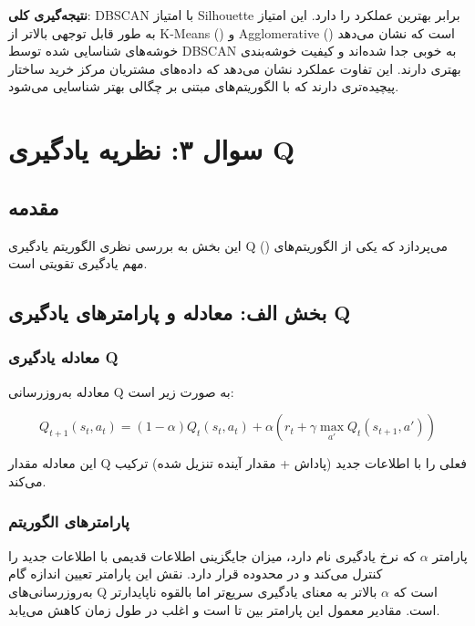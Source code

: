 \documentclass{article}
\begin{document}
\textbf{نتیجه‌گیری کلی}: DBSCAN با امتیاز Silhouette برابر  بهترین عملکرد را دارد. این امتیاز به طور قابل توجهی بالاتر از K-Means () و Agglomerative () است که نشان می‌دهد خوشه‌های شناسایی شده توسط DBSCAN به خوبی جدا شده‌اند و کیفیت خوشه‌بندی بهتری دارند. این تفاوت عملکرد نشان می‌دهد که داده‌های مشتریان مرکز خرید ساختار پیچیده‌تری دارند که با الگوریتم‌های مبتنی بر چگالی بهتر شناسایی می‌شود.

\section{سوال ۳: نظریه یادگیری Q}\label{Section:Q3}

\subsection{مقدمه}

این بخش به بررسی نظری الگوریتم یادگیری Q () می‌پردازد که یکی از الگوریتم‌های مهم یادگیری تقویتی است.

\subsection{بخش الف: معادله و پارامترهای یادگیری Q}

\subsubsection{معادله یادگیری Q}

معادله به‌روزرسانی Q به صورت زیر است:

\begin{equation}
Q_{t+1}(s_t, a_t) = (1 - \alpha) Q_t(s_t, a_t) + \alpha(r_t + \gamma \max_{a'} Q_t(s_{t+1}, a'))
\end{equation}

این معادله مقدار Q فعلی را با اطلاعات جدید (پاداش + مقدار آینده تنزیل شده) ترکیب می‌کند.

\subsubsection{پارامترهای الگوریتم}

پارامتر $\alpha$ که نرخ یادگیری نام دارد، میزان جایگزینی اطلاعات قدیمی با اطلاعات جدید را کنترل می‌کند و در محدوده \lr{[0, 1]} قرار دارد. نقش این پارامتر تعیین اندازه گام به‌روزرسانی‌های Q است که $\alpha$ بالاتر به معنای یادگیری سریع‌تر اما بالقوه ناپایدارتر است. مقادیر معمول این پارامتر بین  تا  است و اغلب در طول زمان کاهش می‌یابد.
\end{document}
